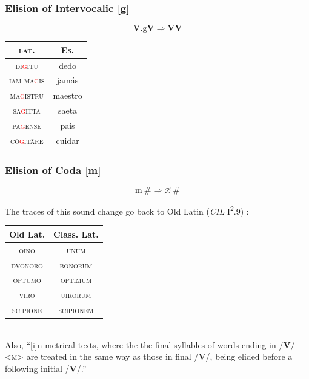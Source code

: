 \documentclass{report}[12pt]
\begin{document}
\subsubsection{Elision of Intervocalic [g]}

\begin{tcolorbox}
  \[ \textbf{V}.\text{g}\textbf{V} \Rightarrow \textbf{V}\textbf{V} \]
\end{tcolorbox}

\begin{tabular}{c c}
  \textsc{lat.} & Es. \\
  \hline
  \textsc{di\textcolor{red}{g}itu} & dedo \\
  \textsc{iam ma\textcolor{red}{g}is} & jamás \\
  \textsc{ma\textcolor{red}{g}istru} & maestro \\
  \textsc{sa\textcolor{red}{g}itta} & saeta \\
  \textsc{pa\textcolor{red}{g}ense} & país \\
  \textsc{c\={o}\textcolor{red}{g}it\={a}re} & cuidar \\
\end{tabular}

\subsubsection{Elision of Coda [m]}

\begin{tcolorbox}
  \[ \text{m}\ \# \Rightarrow \varnothing\ \# \]
\end{tcolorbox}

The traces of this sound change go back to Old Latin (\emph{CIL} I\textsuperscript{2}.9) \parencite[p.~17]{companion_to_latin}: \\
\begin{tabular}{c c}
  Old Lat. & Class. Lat. \\
  \hline
  \textsc{oino} & \textsc{unum} \\
  \textsc{dvonoro} & \textsc{bonorum} \\
  \textsc{optumo} & \textsc{optimum} \\
  \textsc{viro} & \textsc{uirorum} \\
  \textsc{scipione} & \textsc{scipionem} \\
\end{tabular} \\
Also, ``[i]n metrical texts, where the the final syllables of words ending in /\textbf{V}/ $+$ <\textsc{m}> are treated in the same way as those in final /\textbf{V}/, being elided before a following initial /\textbf{V}/.'' \parencite[p.~87]{companion_to_latin}
\end{document}
